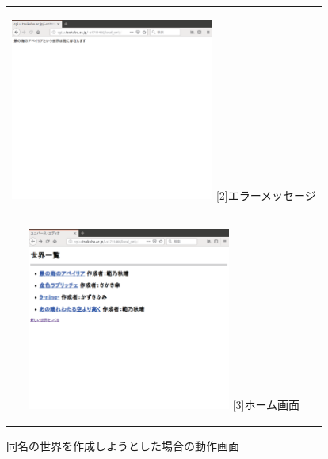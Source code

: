 \documentclass[12pt,a4paper]{jarticle}
\begin{document}
\begin{ttfamily}
\begin{figure}[htbp]
\begin{center}
\begin{tabular}{c}
      \begin{minipage}{0.55\hsize}
        \begin{center}
          \includegraphics[width=6.7cm]{10-3-38.eps}
          \hspace{1.6cm} [2]エラーメッセージ
        \end{center}
      \end{minipage}

      \begin{minipage}{0.55\hsize}
        \vspace{90mm}
      \end{minipage} \\
 
      \begin{minipage}{0.5\hsize}
        \begin{center}
          \includegraphics[width=6.7cm]{10-3-39.eps}
          \hspace{1.6cm} [3]ホーム画面
        \end{center}
      \end{minipage}

    \end{tabular}
    \caption{同名の世界を作成しようとした場合の動作画面}
    \label{fig:b}
  \end{center}
\end{figure}


\end{ttfamily}
\end{document}
